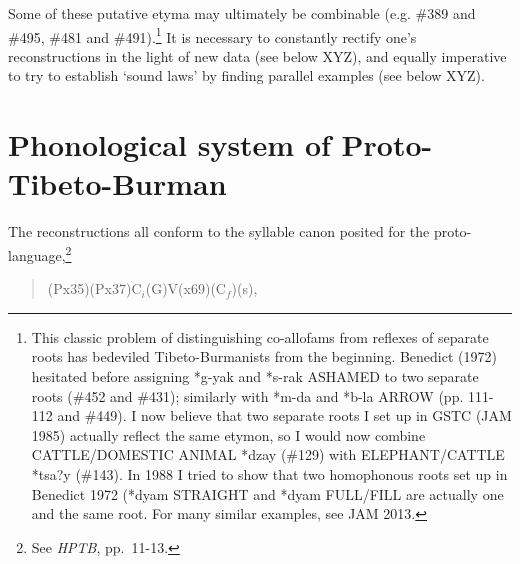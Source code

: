 Some of these putative etyma may ultimately be combinable (e.g. \#389 and \#495, \#481 and \#491).\footnote{ This classic problem of distinguishing co-allofams from reflexes of separate roots has bedeviled Tibeto-Burmanists from the beginning. Benedict (1972) hesitated before assigning *g-yak and *s-rak ASHAMED to two separate roots (\#452 and \#431); similarly with *m-da and *b-la ARROW (pp. 111-112 and \#449). I now believe that two separate roots I set up in GSTC (JAM 1985) actually reflect the same etymon, so I would now combine CATTLE/DOMESTIC ANIMAL *dzay (\#129) with ELEPHANT/CATTLE *tsa?y (\#143). In 1988 I tried to show that two homophonous roots set up in Benedict 1972 (*dyam STRAIGHT and *dyam FULL/FILL are actually one and the same root. For many similar examples, see JAM 2013.} It is necessary to constantly rectify one’s reconstructions in the light of new data (see below XYZ), and equally imperative to try to establish ‘sound laws’ by finding parallel examples (see below XYZ).

\section{Phonological system of Proto-Tibeto-Burman}


The reconstructions all conform to the syllable canon posited for the
proto-language,\footnote{See \textit{HPTB}, pp.~11-13.}

\begin{quote}
(Px35)\hspace{2em}(Px37)\hspace{2em}$\textrm{C}_i$\hspace{2em}(G)\hspace{2em}V\hspace{2em}(x69)\hspace{2em}($\textrm{C}_f$)\hspace{2em}(s),
\end{quote}
	

